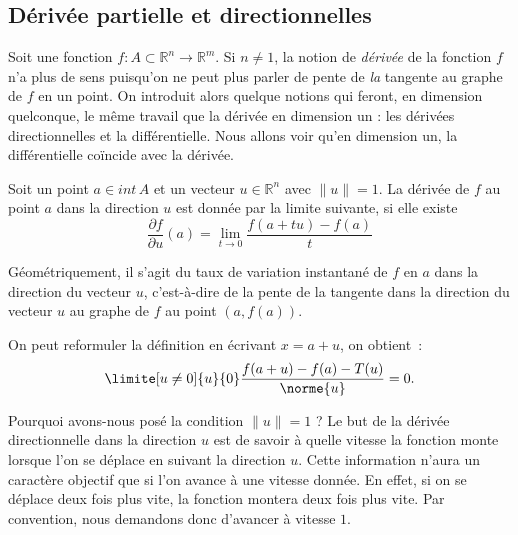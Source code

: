                     \subsection{Dérivée partielle et directionnelles}

Soit une fonction $f:A\subset \mathbb{R}^n \rightarrow \mathbb{R}^m$. Si $n\neq 1$, la notion de \emph{dérivée} de la fonction $f$ n'a plus de sens puisqu'on ne peut plus parler de pente de \emph{la} tangente au graphe de $f$ en un point. On introduit alors quelque notions qui feront, en dimension quelconque, le même travail que la dérivée en dimension un : les dérivées directionnelles et la différentielle. Nous allons voir qu'en dimension un, la différentielle coïncide avec la dérivée.


\begin{definition} 
    Soit un point $a \in int\,A$ et un vecteur $u \in \mathbb{R}^n$ avec $\| u \| =1$. La dérivée de $f$ au point $a$ dans la direction $u$ est donnée par la limite suivante, si elle existe 
    \begin{equation}
        \frac{\partial f}{\partial u}(a) = \lim_{t\rightarrow 0}\frac{f(a+tu) - f(a)}{t}
    \end{equation}
\end{definition}

Géométriquement, il s'agit du taux de variation instantané de $f$ en $a$ dans la direction du vecteur $u$, c'est-à-dire de la pente de la tangente dans la direction du vecteur $u$ au graphe de $f$ au point $(a, f(a))$.

\begin{remark}
On peut reformuler la définition en écrivant $x = a + u$, on obtient~:
\begin{equation}
    \limite[u\neq 0]{u}{0} \frac{f(a+u)-f(a)-T(u)}{\norme{u}} = 0.
\end{equation}
\end{remark}

\begin{remark}
Pourquoi avons-nous posé la condition $\| u \|=1$ ? Le but de la dérivée directionnelle dans la direction $u$ est de savoir à quelle vitesse la fonction monte lorsque l'on se déplace en suivant la direction $u$. Cette information n'aura un caractère \og objectif\fg{} que si l'on avance à une vitesse donnée. En effet, si on se déplace deux fois plus vite, la fonction montera deux fois plus vite. Par convention, nous demandons donc d'avancer à vitesse $1$.
\end{remark}

